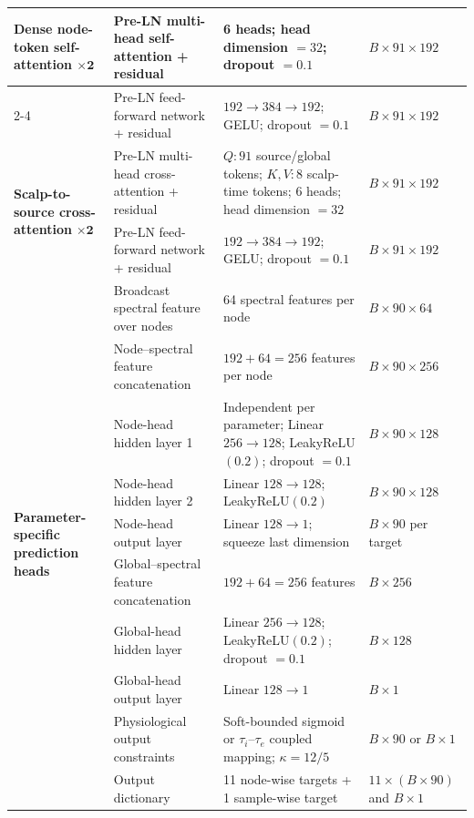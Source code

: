 \documentclass[11pt]{article}
\begin{document}
{\begin{longtable}{p{}p{}p{}p{}}
\multirow{2}{0.16\textwidth}{\textbf{Dense node-token self-attention} $\boldsymbol{\times2}$}
& Pre-LN multi-head self-attention + residual & 6 heads; head dimension $=32$; dropout $=0.1$ & $B\times91\times192$ \\
\cmidrule(l){2-4}
& Pre-LN feed-forward network + residual & $192\rightarrow384\rightarrow192$; GELU; dropout $=0.1$ & $B\times91\times192$ \\
\midrule

\multirow{2}{0.16\textwidth}{\textbf{Scalp-to-source cross-attention} $\boldsymbol{\times2}$}
& Pre-LN multi-head cross-attention + residual & $Q:91$ source/global tokens; $K,V:8$ scalp-time tokens; 6 heads; head dimension $=32$ & $B\times91\times192$ \\
\cmidrule(l){2-4}
& Pre-LN feed-forward network + residual & $192\rightarrow384\rightarrow192$; GELU; dropout $=0.1$ & $B\times91\times192$ \\
\midrule

\multirow{10}{0.16\textwidth}{\textbf{Parameter-specific prediction heads}}
& Broadcast spectral feature over nodes & 64 spectral features per node & $B\times90\times64$ \\
\cmidrule(l){2-4}
& Node--spectral feature concatenation & $192+64=256$ features per node & $B\times90\times256$ \\
\cmidrule(l){2-4}
& Node-head hidden layer 1 & Independent per parameter; Linear $256\rightarrow128$; LeakyReLU$(0.2)$; dropout $=0.1$ & $B\times90\times128$ \\
\cmidrule(l){2-4}
& Node-head hidden layer 2 & Linear $128\rightarrow128$; LeakyReLU$(0.2)$ & $B\times90\times128$ \\
\cmidrule(l){2-4}
& Node-head output layer & Linear $128\rightarrow1$; squeeze last dimension & $B\times90$ per target \\
\cmidrule(l){2-4}
& Global--spectral feature concatenation & $192+64=256$ features & $B\times256$ \\
\cmidrule(l){2-4}
& Global-head hidden layer & Linear $256\rightarrow128$; LeakyReLU$(0.2)$; dropout $=0.1$ & $B\times128$ \\
\cmidrule(l){2-4}
& Global-head output layer & Linear $128\rightarrow1$ & $B\times1$ \\
\cmidrule(l){2-4}
& Physiological output constraints & Soft-bounded sigmoid or $\tau_i$--$\tau_e$ coupled mapping; $\kappa=12/5$ & $B\times90$ or $B\times1$ \\
\cmidrule(l){2-4}
& Output dictionary & 11 node-wise targets + 1 sample-wise target & $11\times(B\times90)$ and $B\times1$ \\
\end{longtable}
}
\end{document}
